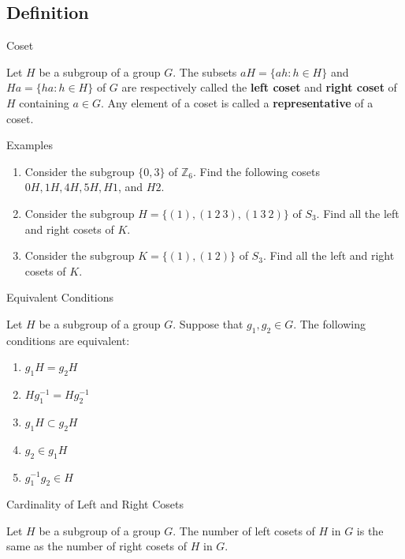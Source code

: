 \documentclass{beamer}
\begin{document}
\subsection{Definition}

\begin{frame}{Coset}
\begin{definition}
\justifying
Let $H$ be a subgroup of a group $G$. The subsets $aH = \{ah: h \in H\}$ and $Ha = \{ha: h \in H\}$ of $G$ are respectively called the \textbf{left coset} and \textbf{right coset} of $H$ containing $a \in G$. Any element of a coset is called a \textbf{representative} of a coset.
\end{definition}    
\end{frame}

\begin{frame}{Examples}
\begin{enumerate}
    \item Consider the subgroup $\{0, 3\}$ of $\mathbb{Z}_6$. Find the following cosets $0H, 1H, 4H, 5H, H1$, and $H2$.
    \item Consider the subgroup $H = \{(1), (1 \ 2 \ 3), (1 \ 3 \ 2)\}$ of $S_3$. Find all the left and right cosets of $K$.
    \item Consider the subgroup $K = \{(1), (1 \ 2)\}$ of $S_3$. Find all the left and right cosets of $K$.
\end{enumerate}    
\end{frame}

\begin{frame}{Equivalent Conditions}
\begin{lemma}
Let $H$ be a subgroup of a group $G$. Suppose that $g_1, g_2 \in G$. The following conditions are equivalent:
\begin{enumerate}
    \item $g_1H = g_2H$
    \item $Hg_1^{-1} = Hg_2^{-1}$
    \item $g_1H \subset g_2H$
    \item $g_2 \in g_1H$
    \item $g_1^{-1}g_2 \in H$
\end{enumerate}
\end{lemma}
\end{frame}

\begin{frame}{Cardinality of Left and Right Cosets}
\begin{theorem}
\justifying
Let $H$ be a subgroup of a group $G$. The number of left cosets of $H$ in $G$ is the same as the number of right cosets of $H$ in $G$.
\end{theorem}    
\end{frame}
\end{document}
